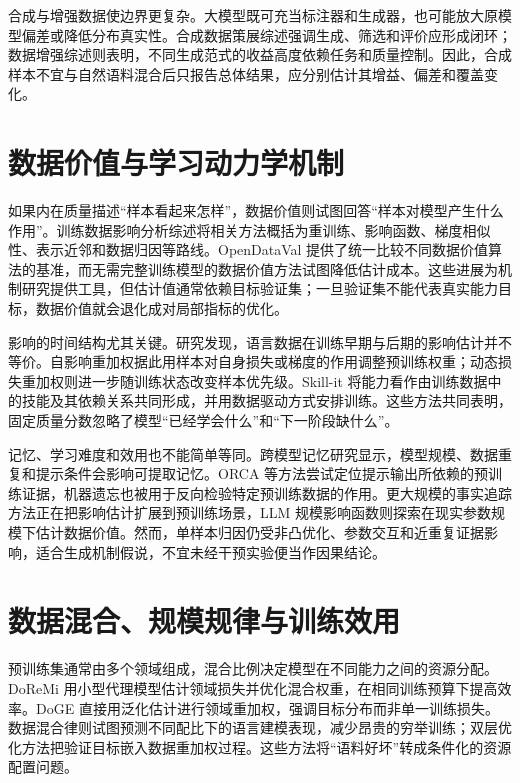 \documentclass[11pt,a4paper]{article}
\begin{document}
合成与增强数据使边界更复杂。大模型既可充当标注器和生成器，也可能放大原模型偏差或降低分布真实性\cite{largelanguagemodels2024}。合成数据策展综述强调生成、筛选和评价应形成闭环\cite{onllmsdriven2024}；数据增强综述则表明，不同生成范式的收益高度依赖任务和质量控制\cite{dataaugmentationusing2024}。因此，合成样本不宜与自然语料混合后只报告总体结果，应分别估计其增益、偏差和覆盖变化。

\section{数据价值与学习动力学机制}

如果内在质量描述“样本看起来怎样”，数据价值则试图回答“样本对模型产生什么作用”。训练数据影响分析综述将相关方法概括为重训练、影响函数、梯度相似性、表示近邻和数据归因等路线\cite{trainingdatainfluence2024}。OpenDataVal 提供了统一比较不同数据价值算法的基准\cite{opendatavalaunified2023}，而无需完整训练模型的数据价值方法试图降低估计成本\cite{datavaluationwithout2023}。这些进展为机制研究提供工具，但估计值通常依赖目标验证集；一旦验证集不能代表真实能力目标，数据价值就会退化成对局部指标的优化。

影响的时间结构尤其关键。研究发现，语言数据在训练早期与后期的影响估计并不等价\cite{firstisbetter2022}。自影响重加权据此用样本对自身损失或梯度的作用调整预训练权重\cite{selfinfluenceguided2023}；动态损失重加权则进一步随训练状态改变样本优先级\cite{dynamiclossbased2025}。Skill-it 将能力看作由训练数据中的技能及其依赖关系共同形成，并用数据驱动方式安排训练\cite{skillita2023}。这些方法共同表明，固定质量分数忽略了模型“已经学会什么”和“下一阶段缺什么”。

记忆、学习难度和效用也不能简单等同。跨模型记忆研究显示，模型规模、数据重复和提示条件会影响可提取记忆\cite{quantifyingmemorizationacross2022}。ORCA 等方法尝试定位提示输出所依赖的预训练证据\cite{orcainterpretingprompted2022}，机器遗忘也被用于反向检验特定预训练数据的作用\cite{decipheringtheimpact2024}。更大规模的事实追踪方法正在把影响估计扩展到预训练场景\cite{scalableinfluenceand2024}，LLM 规模影响函数则探索在现实参数规模下估计数据价值\cite{whatisyour2025}。然而，单样本归因仍受非凸优化、参数交互和近重复证据影响，适合生成机制假说，不宜未经干预实验便当作因果结论。

\section{数据混合、规模规律与训练效用}

预训练集通常由多个领域组成，混合比例决定模型在不同能力之间的资源分配。DoReMi 用小型代理模型估计领域损失并优化混合权重，在相同训练预算下提高效率\cite{doremioptimizingdata2023}。DoGE 直接用泛化估计进行领域重加权，强调目标分布而非单一训练损失\cite{dogedomainreweighting2023}。数据混合律则试图预测不同配比下的语言建模表现，减少昂贵的穷举训练\cite{datamixinglaws2024}；双层优化方法把验证目标嵌入数据重加权过程\cite{scalebioscalablebilevel2024}。这些方法将“语料好坏”转成条件化的资源配置问题。
\end{document}
